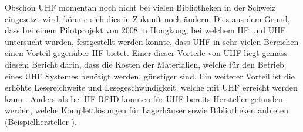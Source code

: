 Obschon \gls{UHF} momentan noch nicht bei vielen Bibliotheken in der Schweiz eingesetzt wird, könnte sich dies in Zukunft noch ändern. Dies aus dem Grund, dass bei einem Pilotprojekt von 2008 in Hongkong, bei welchem \gls{HF} und \gls{UHF} untersucht wurden, festgestellt werden konnte, dass \gls{UHF} in sehr vielen Bereichen einen Vorteil gegenüber \gls{HF} bietet. Einer dieser Vorteile von \gls{UHF} liegt gemäss diesem Bericht darin, dass die Kosten der Materialien, welche für den Betrieb eines \gls{UHF} Systemes benötigt werden, günstiger sind. Ein weiterer Vorteil ist die erhöhte Lesereichweite und Lesegeschwindigkeit, welche mit \gls{UHF} erreicht werden kann \parencite{rfidHfVsUhf}. Anders als bei \gls{HF} \gls{RFID} konnten für \gls{UHF} bereits Hersteller gefunden werden, welche Komplettlösungen für Lagerhäuser sowie Bibliotheken anbieten (Beispielhersteller \cite{litumRFID}).
